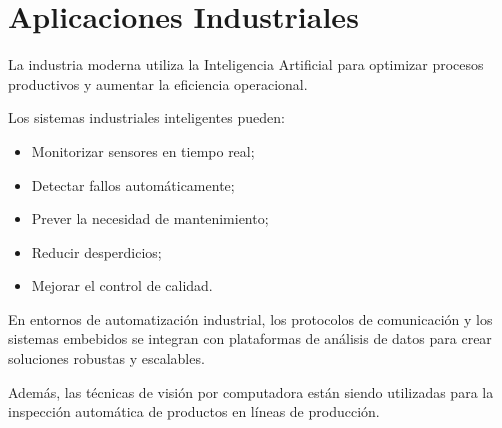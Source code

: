 \section{Aplicaciones Industriales}

La industria moderna utiliza la Inteligencia Artificial para optimizar procesos productivos y aumentar
la eficiencia operacional.

Los sistemas industriales inteligentes pueden:

\begin{itemize}
    \item Monitorizar sensores en tiempo real;
    \item Detectar fallos automáticamente;
    \item Prever la necesidad de mantenimiento;
    \item Reducir desperdicios;
    \item Mejorar el control de calidad.
\end{itemize}

En entornos de automatización industrial, los protocolos de comunicación y los sistemas embebidos se
integran con plataformas de análisis de datos para crear soluciones robustas y escalables.
 
Además, las técnicas de visión por computadora están siendo utilizadas para la inspección automática de
productos en líneas de producción.